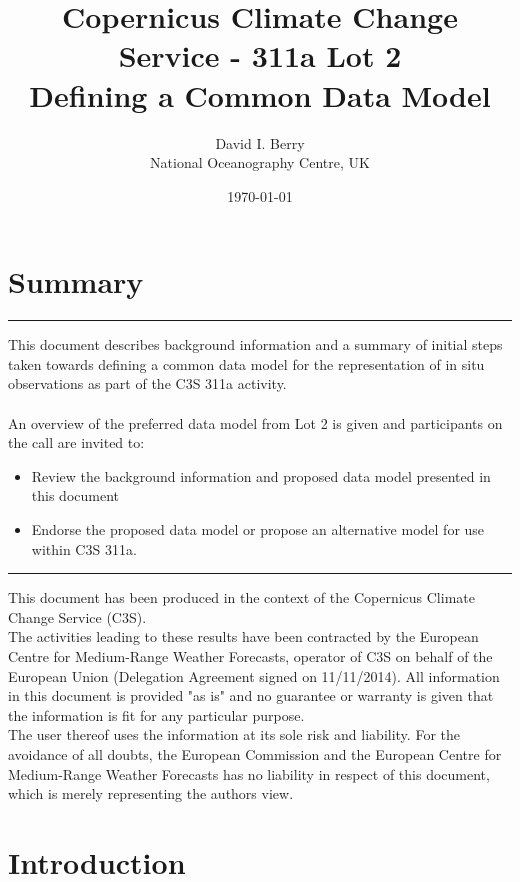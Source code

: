 \documentclass[a4paper]{article}
\title {Copernicus Climate Change Service - 311a Lot 2 \\ Defining a Common Data Model}
\author {David I. Berry \\ National Oceanography Centre, UK}
\date{\today}
\newcounter{FramedDepth}
\newenvironment{Framed}{%
  \addtocounter{FramedDepth}{1}
  \ifcase\theFramedDepth\def\FrameColour{white!50}%
    \or\def\FrameColour{white!50}%
    \or\def\FrameColour{white!50}%
    \or\def\FrameColour{white!50}%
    \fi%
  \begin{mdframed}[style=Framed,backgroundcolor=\FrameColour]%
}{\end{mdframed}\addtocounter{FramedDepth}{-1}}
\begin{document}
\maketitle

\vskip 0.25in
\section*{Summary}
\hrule
\vskip 0.25in
\noindent This document describes background information and a summary of initial steps taken towards defining a common data model for the representation of in situ observations as part of the C3S 311a activity.\\ \\
\noindent An overview of the preferred data model from Lot 2 is given and participants on the call are invited to:\\
\begin{itemize}
\item Review the background information and proposed data model presented in this document
\item Endorse the proposed data model or propose an alternative model for use within C3S 311a.
\end{itemize}
\vskip 0.25in
\hrule

\newpage
\vspace*{\fill}
\begin{Framed}
This document has been produced in the context of the Copernicus Climate Change Service (C3S).\\
The activities leading to these results have been contracted by the European Centre for Medium-Range Weather Forecasts, operator of C3S on behalf of the European Union (Delegation Agreement signed on 11/11/2014). All information in this document is provided "as is" and no guarantee or warranty is given that the information is fit for any particular purpose.\\
The user thereof uses the information at its sole risk and liability. For the avoidance of all doubts, the European Commission
and the European Centre for Medium-Range Weather Forecasts has no liability in respect of this document, which is merely representing the authors view.
\end{Framed}

\newpage
\tableofcontents
\newpage
\listoftables
\newpage


\section {Introduction}
\end{document}
